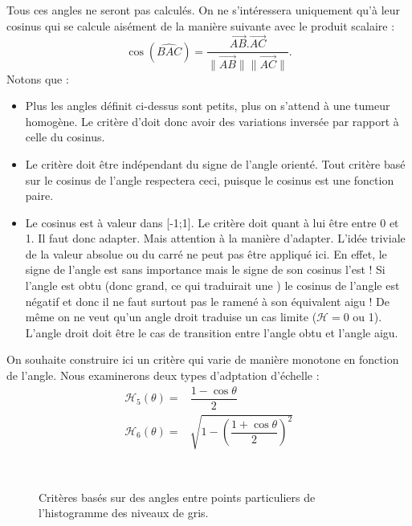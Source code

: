 \documentclass[main.tex]{subfiles}
\begin{document}
Tous ces angles ne seront pas calculés. On ne s'intéressera uniquement qu'à leur cosinus qui se calcule aisément de la manière suivante avec le produit scalaire :
\begin{equation}
\label{eq:cos_prod_scal}
\cos(\widehat{BAC}) = \dfrac{ \overrightarrow{AB}.\overrightarrow{AC} }{ \| \overrightarrow{AB} \| \| \overrightarrow{AC} \|}.
\end{equation}
Notons que :
\begin{itemize}
\item Plus les angles définit ci-dessus sont petits, plus on s'attend à une tumeur homogène. Le critère d'\hetero doit donc avoir des variations inversée par rapport à celle du cosinus.
\item Le critère doit être indépendant du signe de l'angle orienté. Tout critère basé sur le cosinus de l'angle respectera ceci, puisque le cosinus est une fonction paire.
\item Le cosinus est à valeur dans [-1;1]. Le critère doit quant à lui être entre 0 et 1. Il faut donc adapter. Mais attention à la manière d'adapter. L'idée triviale de la valeur absolue ou du  carré ne peut pas être appliqué ici. En effet, le signe de l'angle est sans importance mais le signe de son cosinus l'est ! Si l'angle est obtu (donc grand, ce qui traduirait une \hetero) le cosinus de l'angle est négatif et donc il ne faut surtout pas le ramené à son équivalent aigu ! De même on ne veut qu'un angle droit traduise un cas limite ($\mathcal{H} = 0$ ou 1). L'angle droit doit être le cas de transition entre l'angle obtu et l'angle aigu.
\end{itemize}
On souhaite construire ici un critère qui varie de manière monotone en fonction de l'angle. Nous examinerons deux types d'adptation d'échelle :
\begin{align}
\mathcal{H}_5 (\theta) = &\dfrac{1-\cos \theta}{2} \\
\mathcal{H}_6 (\theta) = &\sqrt{1-\left(  \dfrac{1+\cos \theta}{2}\right)^2}
\end{align}
\begin{figure}
\ 
\caption{\label{fig:crit_hetero_angle}Critères basés sur des angles entre points particuliers de l'histogramme des niveaux de gris.}
\end{figure}
\end{document}
